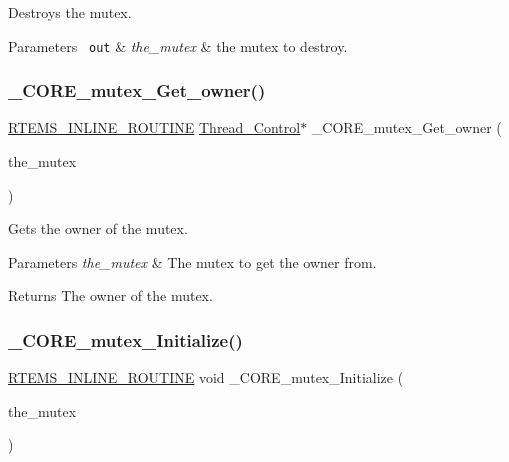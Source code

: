 Destroys the mutex. 


\begin{DoxyParams}[1]{Parameters}
\mbox{\texttt{ out}}  & {\em the\+\_\+mutex} & the mutex to destroy. \\
\hline
\end{DoxyParams}
\mbox{\label{group__RTEMSScoreMutex_gac97696832bb6ad43d333541536040ec3}} 
\subsubsection{\texorpdfstring{\_CORE\_mutex\_Get\_owner()}{\_CORE\_mutex\_Get\_owner()}}
{\footnotesize\ttfamily \mbox{\hyperlink{group__RTEMSScoreBaseDefs_gac216239df231d5dbd15e3520b0b9313f}{R\+T\+E\+M\+S\+\_\+\+I\+N\+L\+I\+N\+E\+\_\+\+R\+O\+U\+T\+I\+NE}} \mbox{\hyperlink{struct__Thread__Control}{Thread\+\_\+\+Control}}$\ast$ \+\_\+\+C\+O\+R\+E\+\_\+mutex\+\_\+\+Get\+\_\+owner (\begin{DoxyParamCaption}\item[{const \mbox{\hyperlink{structCORE__mutex__Control}{C\+O\+R\+E\+\_\+mutex\+\_\+\+Control}} $\ast$}]{the\+\_\+mutex }\end{DoxyParamCaption})}



Gets the owner of the mutex. 


\begin{DoxyParams}{Parameters}
{\em the\+\_\+mutex} & The mutex to get the owner from.\\
\hline
\end{DoxyParams}
\begin{DoxyReturn}{Returns}
The owner of the mutex. 
\end{DoxyReturn}
\mbox{\label{group__RTEMSScoreMutex_ga8bc3af4c8e28f7e9090ca1571a0aead6}} 
\subsubsection{\texorpdfstring{\_CORE\_mutex\_Initialize()}{\_CORE\_mutex\_Initialize()}}
{\footnotesize\ttfamily \mbox{\hyperlink{group__RTEMSScoreBaseDefs_gac216239df231d5dbd15e3520b0b9313f}{R\+T\+E\+M\+S\+\_\+\+I\+N\+L\+I\+N\+E\+\_\+\+R\+O\+U\+T\+I\+NE}} void \+\_\+\+C\+O\+R\+E\+\_\+mutex\+\_\+\+Initialize (\begin{DoxyParamCaption}\item[{\mbox{\hyperlink{structCORE__mutex__Control}{C\+O\+R\+E\+\_\+mutex\+\_\+\+Control}} $\ast$}]{the\+\_\+mutex }\end{DoxyParamCaption})}



